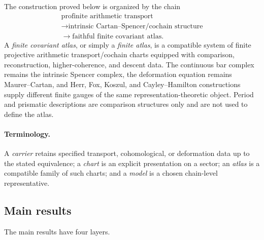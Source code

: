 \documentclass[11pt]{article}
\theoremstyle{definition}
\begin{document}
The construction proved below is organized by the chain
\[
\boxed{
\begin{gathered}
\text{profinite arithmetic transport}\\
\longrightarrow \text{intrinsic Cartan--Spencer/cochain structure}\\
\longrightarrow \text{faithful finite covariant atlas}.
\end{gathered}}
\]
A \emph{finite covariant atlas}, or simply a \emph{finite atlas}, is a compatible system of finite projective arithmetic transport/cochain charts equipped with comparison, reconstruction, higher-coherence, and descent data.  The continuous bar complex remains the intrinsic Spencer complex, the deformation equation remains Maurer--Cartan, and Herr, Fox, Koszul, and Cayley--Hamilton constructions supply different finite gauges of the same representation-theoretic object.  Period and prismatic descriptions are comparison structures only and are not used to define the atlas.

\paragraph{Terminology.}
A \emph{carrier} retains specified transport, cohomological, or deformation data up to the stated equivalence; a \emph{chart} is an explicit presentation on a sector; an \emph{atlas} is a compatible family of such charts; and a \emph{model} is a chosen chain-level representative.

\subsection{Main results}

The main results have four layers.
\end{document}

